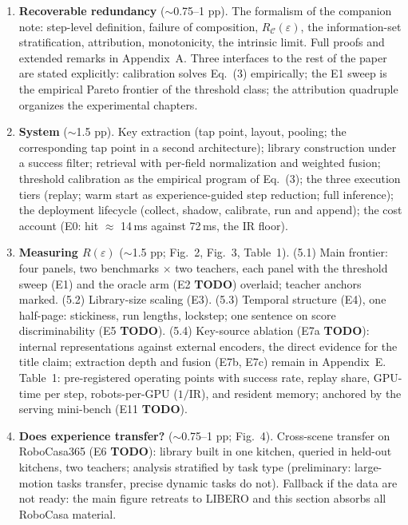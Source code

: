 \documentclass{article}
\newcommand{\TODO}{\colorbox{red!15}{\scriptsize\textbf{TODO}}}
\begin{document}
\begin{enumerate}[leftmargin=1.6em, itemsep=0.5em, topsep=0.3em]
\item \textbf{Recoverable redundancy} ($\sim$0.75--1 pp).
The formalism of the companion note: step-level definition, failure of
composition, $R_{\mathcal{C}}(\varepsilon)$, the information-set
stratification, attribution, monotonicity, the intrinsic limit. Full proofs
and extended remarks in Appendix~A. Three interfaces to the rest of the paper
are stated explicitly: calibration solves Eq.~(3) empirically; the E1 sweep is
the empirical Pareto frontier of the threshold class; the attribution
quadruple organizes the experimental chapters.

\item \textbf{System} ($\sim$1.5 pp).
Key extraction (tap point, layout, pooling; the corresponding tap point in a
second architecture); library construction under a success filter; retrieval
with per-field normalization and weighted fusion; threshold calibration as the
empirical program of Eq.~(3); the three execution tiers (replay; warm start as
experience-guided step reduction; full inference); the deployment lifecycle
(collect, shadow, calibrate, run and append); the cost account (E0: hit
$\approx$ 14\,ms against 72\,ms, the $\mathrm{IR}$ floor).

\item \textbf{Measuring $R(\varepsilon)$} ($\sim$1.5 pp; Fig.~2, Fig.~3,
Table~1).
(5.1) Main frontier: four panels, two benchmarks $\times$ two teachers, each
panel with the threshold sweep (E1) and the oracle arm (E2 \TODO) overlaid;
teacher anchors marked.
(5.2) Library-size scaling (E3).
(5.3) Temporal structure (E4), one half-page: stickiness, run lengths,
lockstep; one sentence on score discriminability (E5 \TODO).
(5.4) Key-source ablation (E7a \TODO): internal representations against
external encoders, the direct evidence for the title claim; extraction depth
and fusion (E7b, E7c) remain in Appendix~E.
Table~1: pre-registered operating points with success rate, replay share,
GPU-time per step, robots-per-GPU ($1/\mathrm{IR}$), and resident memory;
anchored by the serving mini-bench (E11 \TODO).

\item \textbf{Does experience transfer?} ($\sim$0.75--1 pp; Fig.~4).
Cross-scene transfer on RoboCasa365 (E6 \TODO): library built in one kitchen,
queried in held-out kitchens, two teachers; analysis stratified by task type
(preliminary: large-motion tasks transfer, precise dynamic tasks do not).
Fallback if the data are not ready: the main figure retreats to LIBERO and
this section absorbs all RoboCasa material.


\end{enumerate}
\end{document}
